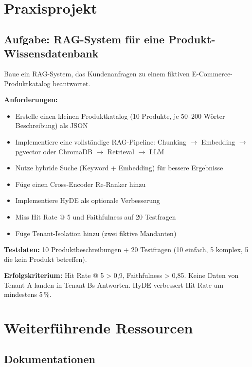 \section{Praxisprojekt}

\subsection{Aufgabe: RAG-System für eine Produkt-Wissensdatenbank}

Baue ein RAG-System, das Kundenanfragen zu einem fiktiven E-Commerce-Produktkatalog beantwortet.

\textbf{Anforderungen:}
\begin{itemize}[leftmargin=*]
    \item Erstelle einen kleinen Produktkatalog (10 Produkte, je 50--200 Wörter Beschreibung) als JSON
    \item Implementiere eine vollständige RAG-Pipeline: Chunking $\rightarrow$ Embedding $\rightarrow$ pgvector oder ChromaDB $\rightarrow$ Retrieval $\rightarrow$ LLM
    \item Nutze hybride Suche (Keyword + Embedding) für bessere Ergebnisse
    \item Füge einen Cross-Encoder Re-Ranker hinzu
    \item Implementiere HyDE als optionale Verbesserung
    \item Miss Hit Rate @ 5 und Faithfulness auf 20 Testfragen
    \item Füge Tenant-Isolation hinzu (zwei fiktive Mandanten)
\end{itemize}

\textbf{Testdaten:} 10 Produktbeschreibungen + 20 Testfragen (10 einfach, 5 komplex, 5 die kein Produkt betreffen).

\textbf{Erfolgskriterium:} Hit Rate @ 5 > 0,9, Faithfulness > 0,85. Keine Daten von Tenant A landen in Tenant Bs Antworten. HyDE verbessert Hit Rate um mindestens 5\,\%.

\section{Weiterführende Ressourcen}

\subsection{Dokumentationen}

